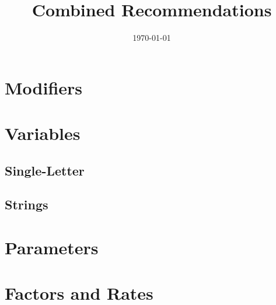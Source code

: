 \documentclass[12pt]{econtex}
\begin{document}
\title{Combined Recommendations}

\date{\today}
\maketitle 

\pagebreak

\section{Modifiers}



\section{Variables}

\subsection{Single-Letter}



\subsection{Strings}



\section{Parameters}


\section{Factors and Rates}

\end{document}

